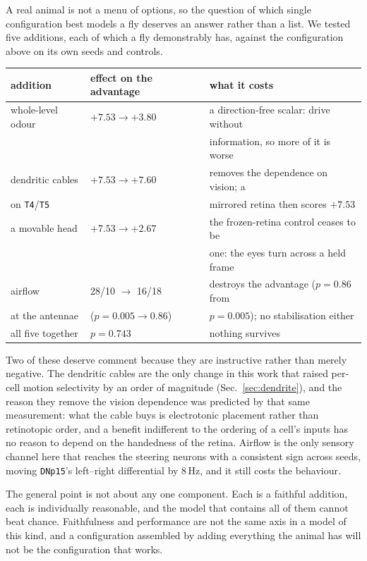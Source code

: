 \documentclass[10pt,twoside]{article}
\newcommand{\cell}[1]{\texttt{#1}}
\begin{document}
A real animal is not a menu of options, so the question of which single
configuration best models a fly deserves an answer rather than a list. We
tested five additions, each of which a fly demonstrably has, against the
configuration above on its own seeds and controls.

\begin{center}
\small
\begin{tabular}{lll}
\toprule
addition & effect on the advantage & what it costs\\
\midrule
whole-level odour & $+7.53\to+3.80$ & a direction-free scalar: drive without\\
                  &                 & information, so more of it is worse\\
\addlinespace
dendritic cables  & $+7.53\to+7.60$ & removes the dependence on vision; a\\
on \cell{T4}/\cell{T5} &            & mirrored retina then scores $+7.53$\\
\addlinespace
a movable head    & $+7.53\to+2.67$ & the frozen-retina control ceases to be\\
                  &                 & one: the eyes turn across a held frame\\
\addlinespace
airflow           & 28/10 $\to$ 16/18 & destroys the advantage ($p=0.86$ from\\
at the antennae   & ($p=0.005\to0.86$) & $p=0.005$); no stabilisation either\\
\addlinespace
all five together & $p=0.743$        & nothing survives\\
\bottomrule
\end{tabular}
\end{center}

Two of these deserve comment because they are instructive rather than merely
negative. The dendritic cables are the only change in this work that raised
per-cell motion selectivity by an order of magnitude (Sec.~\ref{sec:dendrite}),
and the reason they remove the vision dependence was predicted by that same
measurement: what the cable buys is electrotonic placement rather than
retinotopic order, and a benefit indifferent to the ordering of a cell's inputs
has no reason to depend on the handedness of the retina. Airflow is the only
sensory channel here that reaches the steering neurons with a consistent sign
across seeds, moving \cell{DNp15}'s left--right differential by $8$\,Hz, and it
still costs the behaviour.

The general point is not about any one component. Each is a faithful addition,
each is individually reasonable, and the model that contains all of them cannot
beat chance. Faithfulness and performance are not the same axis in a model of
this kind, and a configuration assembled by adding everything the animal has
will not be the configuration that works.
\end{document}
